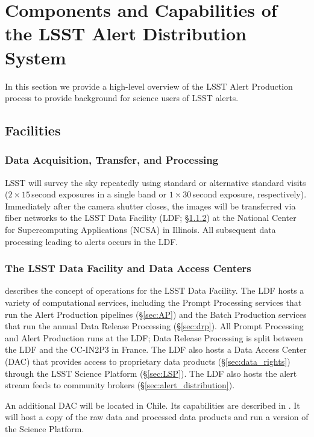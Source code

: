 \section{Components and Capabilities of the LSST Alert Distribution System}\label{sec:components}

In this section we provide a high-level overview of the LSST Alert Production process to provide background for science users of LSST alerts.

\subsection{Facilities}

\subsubsection{Data Acquisition, Transfer, and Processing}

LSST will survey the sky repeatedly using standard or alternative standard visits ($2\times15$\,second exposures in a single band or $1\times30$\,second exposure, respectively).  
Immediately after the camera shutter closes, the images will be transferred via fiber networks to the LSST Data Facility (LDF; \S \ref{sec:LDF}) at the National Center for Supercomputing Applications (NCSA) in Illinois.
All subsequent data processing leading to alerts occurs in the LDF.

\subsubsection{The LSST Data Facility and Data Access Centers} \label{sec:LDF}

 describes the concept of operations for the LSST Data Facility.
The LDF hosts a variety of computational services, including the Prompt Processing services that run the Alert Production pipelines (\S \ref{sec:AP}) and the Batch Production services that run the annual Data Release Processing (\S \ref{sec:drp}). 
All Prompt Processing and Alert Production runs at the LDF;
Data Release Processing is split between the LDF and the CC-IN2P3 in France.
The LDF also hosts a Data Access Center (DAC) that provides access to proprietary data products (\S \ref{sec:data_rights}) through the LSST Science Platform (\S \ref{sec:LSP}).
The LDF also hosts the alert stream feeds to community brokers (\S \ref{sec:alert_distribution}).

An additional DAC will be located in Chile.  
Its capabilities are described in .
It will host a copy of the raw data and processed data products and run a version of the Science Platform.

